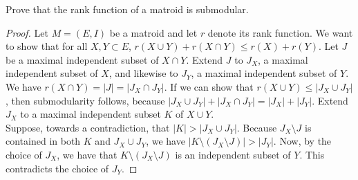 \documentclass[12pt]{article}
\newenvironment{problem}[2][Problem]{\begin{trivlist}
\item[\hskip \labelsep {\bfseries #1}\hskip \labelsep {\bfseries #2.}]}{\end{trivlist}}
\theoremstyle{plain}
\begin{document}
\begin{problem}{10}
    Prove that the rank function of a matroid is submodular.
\end{problem}
\begin{proof}
    Let $M=(E,I)$ be a matroid and let $r$ denote its rank function. We want to show that for all $X,Y\subset E$, $r(X\cup Y) + r(X\cap Y) \leq r(X)+r(Y)$. Let $J$ be a maximal independent subset of $X\cap Y$. Extend $J$ to $J_X$, a maximal independent subset of $X$, and likewise to $J_Y$, a maximal independent subset of $Y$. We have $r(X \cap Y)=|J| = |J_X\cap J_Y|$. If we can show that $r(X\cup Y)\leq |J_X\cup J_Y|$, then submodularity follows, because $|J_X\cup J_Y|+|J_X\cap J_Y|=|J_X|+|J_Y|$. Extend $J_X$ to a maximal independent subset $K$ of $X\cup Y$.\\
    \indent Suppose, towards a contradiction, that $|K|>|J_X\cup J_Y|$. Because $J_X\setminus J$ is contained in both $K$ and $J_X\cup J_Y$, we have $|K\setminus (J_X\setminus J)|>|J_Y|$. Now, by the choice of $J_X$, we have that $K\setminus(J_X\setminus J)$ is an independent subset of $Y$. This contradicts the choice of $J_Y$.
\end{proof}
\end{document}
